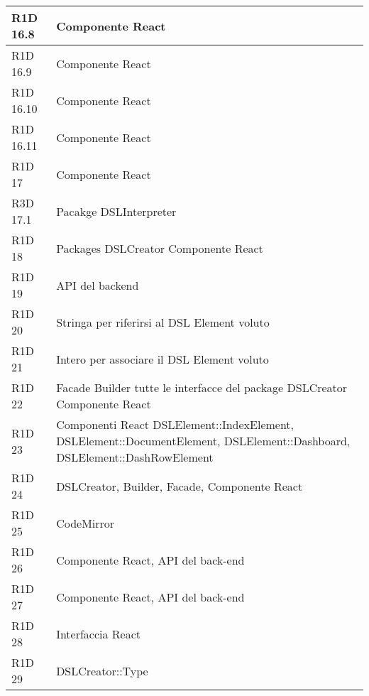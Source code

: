 \begin{center}
\begin{longtable}{ | l | p{8cm} |}
	R1D 16.8 & Componente React \\ \hline

	R1D 16.9 & Componente React \\ \hline

	R1D 16.10 & Componente React \\ \hline

	R1D 16.11 & Componente React \\ \hline

	R1D 17 & Componente React \\ \hline 

	R3D 17.1 & Pacakge DSLInterpreter \\ \hline

	R1D 18 & Packages DSLCreator \newline Componente React \\ \hline

	R1D 19 & API del backend \\ \hline

	R1D 20 & Stringa per riferirsi al DSL Element voluto \\ \hline
 
	R1D 21 & Intero per associare il DSL Element voluto \\ \hline

	R1D 22 & Facade \newline Builder \newline tutte le interfacce del package DSLCreator \newline Componente React \\ \hline

	R1D 23 & Componenti React \newline DSLElement::IndexElement, DSLElement::DocumentElement, DSLElement::Dashboard, DSLElement::DashRowElement \\ \hline

	R1D 24 & DSLCreator, Builder, Facade, Componente React \\ \hline
 
	R1D 25 & CodeMirror \\ \hline

	R1D 26 & Componente React, API del back-end \\ \hline

	R1D 27 & Componente React, API del back-end \\ \hline

	R1D 28 & Interfaccia React \\ \hline

	R1D 29 & DSLCreator::Type \\ \hline


\end{longtable}
\end{center}
